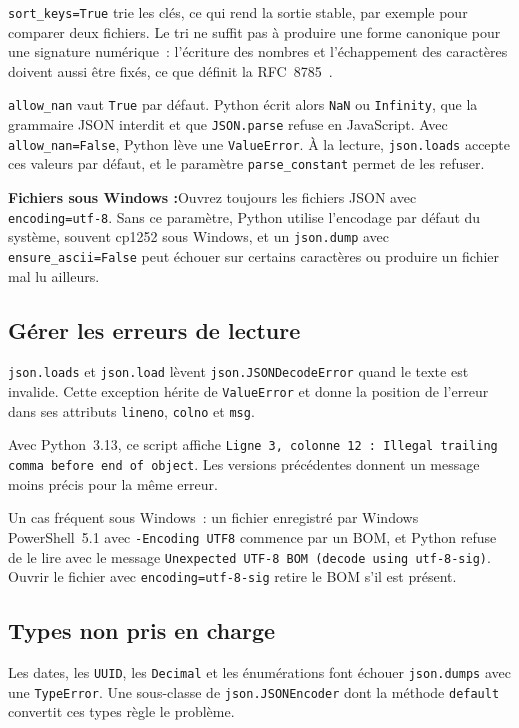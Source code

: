 \documentclass[12pt,a4paper]{article}
\newcommand{\warningbox}[2]{%
  \vspace{10pt}%
  \noindent\colorbox{accent!10}{%
    \parbox{\dimexpr\textwidth-2\fboxsep\relax}{%
      \vspace{4pt}\textbf{\color{accent}#1 :}\hspace{0.5em}\color{darkgray}#2\vspace{4pt}%
    }%
  }%
  \vspace{10pt}%
}
\newcommand{\exemple}[3][]{%
  \par\addvspace{6pt}\noindent\begin{minipage}{\linewidth}%
  \end{minipage}\par\addvspace{6pt}}
\begin{document}
\texttt{sort\_keys=True} trie les clés, ce qui rend la sortie stable, par exemple pour comparer deux fichiers. Le tri ne suffit pas à produire une forme canonique pour une signature numérique~: l'écriture des nombres et l'échappement des caractères doivent aussi être fixés, ce que définit la RFC~8785~\cite{rundgren2020rfc8785}.

\texttt{allow\_nan} vaut \texttt{True} par défaut. Python écrit alors \texttt{NaN} ou \texttt{Infinity}, que la grammaire JSON interdit et que \texttt{JSON.parse} refuse en JavaScript. Avec \texttt{allow\_nan=False}, Python lève une \texttt{ValueError}. À la lecture, \texttt{json.loads} accepte ces valeurs par défaut, et le paramètre \texttt{parse\_constant} permet de les refuser.

\warningbox{Fichiers sous Windows}{Ouvrez toujours les fichiers JSON avec \texttt{encoding=\textquotedbl utf-8\textquotedbl}. Sans ce paramètre, Python utilise l'encodage par défaut du système, souvent cp1252 sous Windows, et un \texttt{json.dump} avec \texttt{ensure\_ascii=False} peut échouer sur certains caractères ou produire un fichier mal lu ailleurs.}

\subsection{Gérer les erreurs de lecture}
\texttt{json.loads} et \texttt{json.load} lèvent \texttt{json.JSONDecodeError} quand le texte est invalide. Cette exception hérite de \texttt{ValueError} et donne la position de l'erreur dans ses attributs \texttt{lineno}, \texttt{colno} et \texttt{msg}.

\exemple[language=python]{python/02_erreurs.py}{Localiser une erreur de syntaxe}

Avec Python~3.13, ce script affiche \texttt{Ligne 3, colonne 12 : Illegal trailing comma before end of object}. Les versions précédentes donnent un message moins précis pour la même erreur.

Un cas fréquent sous Windows~: un fichier enregistré par Windows PowerShell~5.1 avec \texttt{-Encoding UTF8} commence par un BOM, et Python refuse de le lire avec le message \texttt{Unexpected UTF-8 BOM (decode using utf-8-sig)}. Ouvrir le fichier avec \texttt{encoding=\textquotedbl utf-8-sig\textquotedbl} retire le BOM s'il est présent.

\subsection{Types non pris en charge}
Les dates, les \texttt{UUID}, les \texttt{Decimal} et les énumérations font échouer \texttt{json.dumps} avec une \texttt{TypeError}. Une sous-classe de \texttt{json.JSONEncoder} dont la méthode \texttt{default} convertit ces types règle le problème.
\end{document}
